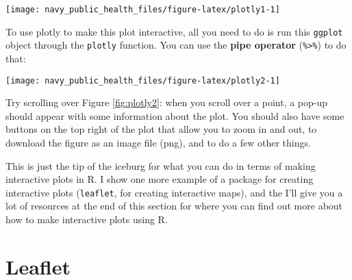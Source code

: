 \documentclass[]{tufte-book}
\newenvironment{Shaded}{}{}
\newcommand{\DataTypeTok}[1]{\textcolor[rgb]{0.56,0.13,0.00}{#1}}
\newcommand{\DecValTok}[1]{\textcolor[rgb]{0.25,0.63,0.44}{#1}}
\newcommand{\KeywordTok}[1]{\textcolor[rgb]{0.00,0.44,0.13}{\textbf{#1}}}
\newcommand{\NormalTok}[1]{#1}
\newcommand{\OperatorTok}[1]{\textcolor[rgb]{0.40,0.40,0.40}{#1}}
\newcommand{\StringTok}[1]{\textcolor[rgb]{0.25,0.44,0.63}{#1}}
\begin{document}
\begin{figure*}
\texttt{[image: navy\_public\_health\_files/figure-latex/plotly1-1]} \end{figure*}

To use plotly to make this plot interactive, all you need to do is run this \texttt{ggplot} object
through the \texttt{plotly} function. You can use the \textbf{pipe operator} (\texttt{\%\textgreater{}\%}) to do that:

\begin{Shaded}
\end{Shaded}

\begin{figure*}
\texttt{[image: navy\_public\_health\_files/figure-latex/plotly2-1]} \end{figure*}

Try scrolling over Figure \ref{fig:plotly2}: when you scroll over a point, a pop-up should
appear with some information about the plot. You should also have some buttons on the top
right of the plot that allow you to zoom in and out, to download the figure as an image
file (png), and to do a few other things.

This is just the tip of the iceburg for what you can do in terms of making interactive plots
in R. I show one more example of a package for creating interactive plots (\texttt{leaflet}, for
creating interactive maps), and the I'll give you a lot of resources at the end of this
section for where you can find out more about how to make interactive plots using R.

\hypertarget{leaflet}{%
\section{Leaflet}\label{leaflet}}

\begin{Shaded}
\end{Shaded}
\end{document}
